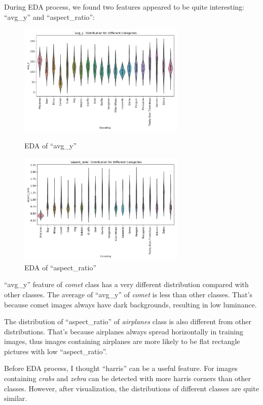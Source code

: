 \documentclass[a4paper, 11pt]{article}
\begin{document}
During EDA process, we found two features appeared to be quite interesting: ``avg\_y'' and ``aspect\_ratio'':

\begin{figure}[!h]
\centering
\begin{minipage}[t]{0.48\textwidth}
\centering
\includegraphics[width=8cm]{image/avg_y.jpg}
\caption{\label{fig:avg_y}EDA of ``avg\_y''}
\end{minipage}
\begin{minipage}[t]{0.48\textwidth}
\centering
\includegraphics[width=8cm]{image/aspect_ratio.jpg}
\caption{\label{fig:aspect_ratio}EDA of ``aspect\_ratio''}
\end{minipage}
\end{figure}

``avg\_y'' feature of \textit{comet} class has a very different distribution compared with other classes. The average of ``avg\_y'' of \textit{comet} is less than other classes. That's because comet images always have dark backgrounds, resulting in low luminance. 

The distribution of ``aspect\_ratio'' of \textit{airplanes} class is also different from other distributions. That's because airplanes always spread horizontally in training images, thus images containing airplanes are more likely to be flat rectangle pictures with low ``aspect\_ratio''.

Before EDA process, I thought ``harris'' can be a useful feature. For images containing \textit{crabs} and \textit{zebra} can be detected with more harris corners than other classes. However, after visualization, the distributions of different classes are quite similar.
\end{document}
